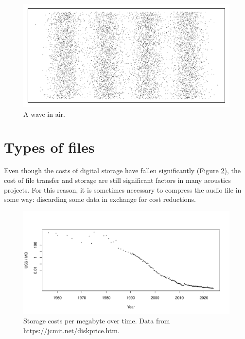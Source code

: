\documentclass[
]{book}
\begin{document}
\begin{figure}

{\centering \includegraphics[width=0.9\linewidth]{_main_files/figure-latex/wave-in-air-1} 

}

\caption{A wave in air.}\label{fig:wave-in-air}
\end{figure}

\hypertarget{types-of-files}{%
\section{Types of files}\label{types-of-files}}

Even though the costs of digital storage have fallen significantly (Figure \ref{fig:storage-costs}), the cost of file transfer and storage are still significant factors in many acoustics projects. For this reason, it is sometimes necessary to compress the audio file in some way: discarding some data in exchange for cost reductions.

\begin{figure}

{\centering \includegraphics[width=0.9\linewidth]{_main_files/figure-latex/storage-costs-1} 

}

\caption{Storage costs per megabyte over time. Data from https://jcmit.net/diskprice.htm.}\label{fig:storage-costs}
\end{figure}
\end{document}
